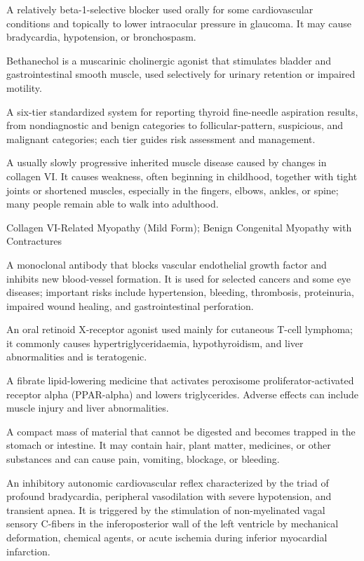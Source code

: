  A relatively beta-1-selective blocker used orally for some cardiovascular conditions and topically to lower intraocular pressure in glaucoma. It may cause bradycardia, hypotension, or bronchospasm.

 Bethanechol is a muscarinic cholinergic agonist that stimulates bladder and gastrointestinal smooth muscle, used selectively for urinary retention or impaired motility.

 A six-tier standardized system for reporting thyroid fine-needle aspiration results, from nondiagnostic and benign categories to follicular-pattern, suspicious, and malignant categories; each tier guides risk assessment and management.

 A usually slowly progressive inherited muscle disease caused by changes in collagen VI. It causes weakness, often beginning in childhood, together with tight joints or shortened muscles, especially in the fingers, elbows, ankles, or spine; many people remain able to walk into adulthood.

\synonyms
Collagen VI-Related Myopathy (Mild Form); Benign Congenital Myopathy with Contractures

 A monoclonal antibody that blocks vascular endothelial growth factor and inhibits new blood-vessel formation. It is used for selected cancers and some eye diseases; important risks include hypertension, bleeding, thrombosis, proteinuria, impaired wound healing, and gastrointestinal perforation.

 An oral retinoid X-receptor agonist used mainly for cutaneous T-cell lymphoma; it commonly causes hypertriglyceridaemia, hypothyroidism, and liver abnormalities and is teratogenic.

 A fibrate lipid-lowering medicine that activates
peroxisome proliferator-activated receptor alpha (PPAR-alpha) and lowers
triglycerides. Adverse effects can include muscle injury and liver abnormalities.

 A compact mass of material that cannot be digested and becomes trapped in the stomach or intestine. It may contain hair, plant matter, medicines, or other substances and can cause pain, vomiting, blockage, or bleeding.

 An inhibitory autonomic cardiovascular reflex characterized by the triad of profound bradycardia, peripheral vasodilation with severe hypotension, and transient apnea. It is triggered by the stimulation of non-myelinated vagal sensory C-fibers in the inferoposterior wall of the left ventricle by mechanical deformation, chemical agents, or acute ischemia during inferior myocardial infarction.

